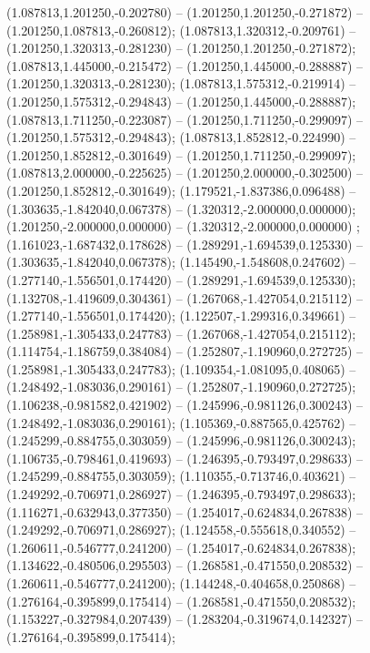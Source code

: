 (1.087813,1.201250,-0.202780) -- (1.201250,1.201250,-0.271872) -- (1.201250,1.087813,-0.260812);
 (1.087813,1.320312,-0.209761) -- (1.201250,1.320313,-0.281230) -- (1.201250,1.201250,-0.271872);
 (1.087813,1.445000,-0.215472) -- (1.201250,1.445000,-0.288887) -- (1.201250,1.320313,-0.281230);
 (1.087813,1.575312,-0.219914) -- (1.201250,1.575312,-0.294843) -- (1.201250,1.445000,-0.288887);
 (1.087813,1.711250,-0.223087) -- (1.201250,1.711250,-0.299097) -- (1.201250,1.575312,-0.294843);
 (1.087813,1.852812,-0.224990) -- (1.201250,1.852812,-0.301649) -- (1.201250,1.711250,-0.299097);
 (1.087813,2.000000,-0.225625) -- (1.201250,2.000000,-0.302500) -- (1.201250,1.852812,-0.301649);
 (1.179521,-1.837386,0.096488) -- (1.303635,-1.842040,0.067378) -- (1.320312,-2.000000,0.000000);
 (1.201250,-2.000000,0.000000) -- (1.320312,-2.000000,0.000000) ;
 (1.161023,-1.687432,0.178628) -- (1.289291,-1.694539,0.125330) -- (1.303635,-1.842040,0.067378);
 (1.145490,-1.548608,0.247602) -- (1.277140,-1.556501,0.174420) -- (1.289291,-1.694539,0.125330);
 (1.132708,-1.419609,0.304361) -- (1.267068,-1.427054,0.215112) -- (1.277140,-1.556501,0.174420);
 (1.122507,-1.299316,0.349661) -- (1.258981,-1.305433,0.247783) -- (1.267068,-1.427054,0.215112);
 (1.114754,-1.186759,0.384084) -- (1.252807,-1.190960,0.272725) -- (1.258981,-1.305433,0.247783);
 (1.109354,-1.081095,0.408065) -- (1.248492,-1.083036,0.290161) -- (1.252807,-1.190960,0.272725);
 (1.106238,-0.981582,0.421902) -- (1.245996,-0.981126,0.300243) -- (1.248492,-1.083036,0.290161);
 (1.105369,-0.887565,0.425762) -- (1.245299,-0.884755,0.303059) -- (1.245996,-0.981126,0.300243);
 (1.106735,-0.798461,0.419693) -- (1.246395,-0.793497,0.298633) -- (1.245299,-0.884755,0.303059);
 (1.110355,-0.713746,0.403621) -- (1.249292,-0.706971,0.286927) -- (1.246395,-0.793497,0.298633);
 (1.116271,-0.632943,0.377350) -- (1.254017,-0.624834,0.267838) -- (1.249292,-0.706971,0.286927);
 (1.124558,-0.555618,0.340552) -- (1.260611,-0.546777,0.241200) -- (1.254017,-0.624834,0.267838);
 (1.134622,-0.480506,0.295503) -- (1.268581,-0.471550,0.208532) -- (1.260611,-0.546777,0.241200);
 (1.144248,-0.404658,0.250868) -- (1.276164,-0.395899,0.175414) -- (1.268581,-0.471550,0.208532);
 (1.153227,-0.327984,0.207439) -- (1.283204,-0.319674,0.142327) -- (1.276164,-0.395899,0.175414);
